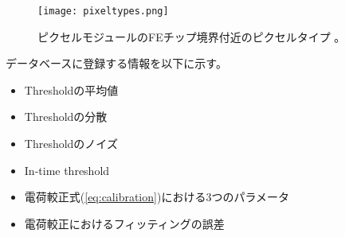 \begin{figure}[tbp]
  \centering
  \texttt{[image: pixeltypes.png]}
  \caption[ピクセルモジュールのFEチップ境界付近のピクセルタイプ]{ピクセルモジュールのFEチップ境界付近のピクセルタイプ \cite{pixeltypes}。}
  \label{fig:pixeltypes}
\end{figure}

データベースに登録する情報を以下に示す。
\begin{itemize}
  \item Thresholdの平均値
  \item Thresholdの分散
  \item Thresholdのノイズ
  \item In-time threshold
  \item 電荷較正式(\ref{eq:calibration})における3つのパラメータ
  \item 電荷較正におけるフィッティングの誤差
\end{itemize}




\newpage
